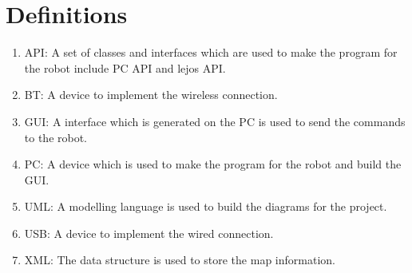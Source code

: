 \documentclass[11pt, a4paper]{report}
\begin{document}
\section{Definitions}
\begin{enumerate}
\item API: A set of classes and interfaces which are used to make the program for the robot include PC API and lejos API.\\
\item BT: A device to implement the wireless connection.\\
\item GUI: A interface which is generated on the PC is used to send the commands to the robot.\\
\item PC: A device which is used to make the program for the robot and build the GUI.\\
\item UML: A modelling language is used to build the diagrams for the project.\\
\item USB: A device to implement the wired connection.\\
\item XML: The data structure is used to store the map information.\\
\end{enumerate}
\pagebreak
\newpage
\appendix

\pagebreak
\end{document}

